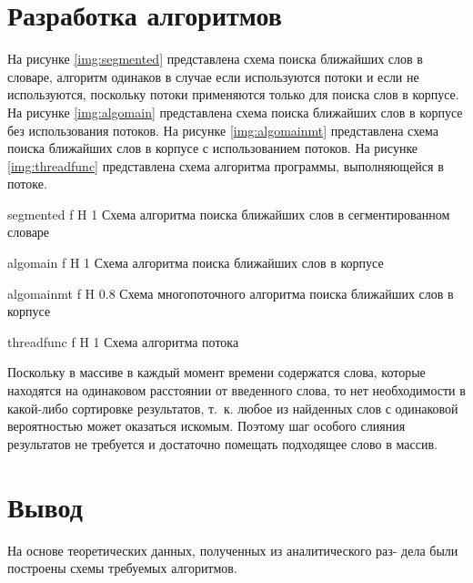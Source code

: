\section{Разработка алгоритмов}


На рисунке \ref{img:segmented} представлена схема поиска ближайших слов в словаре, алгоритм одинаков в случае если используются потоки и если не используются, поскольку потоки применяются только для поиска слов в корпусе. 
На рисунке \ref{img:algomain} представлена схема поиска ближайших слов в корпусе без использования потоков. 
На рисунке \ref{img:algomainmt} представлена схема поиска ближайших слов в корпусе с использованием потоков. 
На рисунке \ref{img:threadfunc} представлена схема алгоритма программы, выполняющейся в потоке. 


{segmented} %
{f} %
{H} %
{1\textwidth} %
{Схема алгоритма поиска ближайших слов в сегментированном словаре} %


{algomain} %
{f} %
{H} %
{1\textwidth} %
{Схема алгоритма поиска ближайших слов в корпусе} %


{algomainmt} %
{f} %
{H} %
{0.8\textwidth} %
{Схема многопоточного алгоритма поиска ближайших слов в корпусе} %


{threadfunc} %
{f} %
{H} %
{1\textwidth} %
{Схема алгоритма потока} %


Поскольку в массиве в каждый момент времени содержатся слова, которые находятся на одинаковом расстоянии от введенного слова, то нет необходимости в какой-либо сортировке результатов, т.~к. любое из найденных слов с одинаковой вероятностью может оказаться искомым. Поэтому шаг особого слияния результатов не требуется и достаточно помещать подходящее слово в массив.

\section*{Вывод}
На основе теоретических данных, полученных из аналитического раз-
дела были построены схемы требуемых алгоритмов. 
